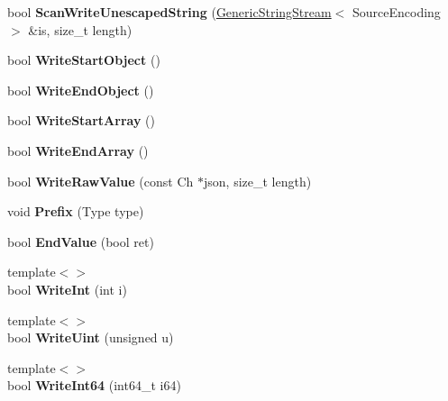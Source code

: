 \begin{DoxyCompactItemize}
\mbox{\label{classWriter_a1a886f73bd0b094043899a71b65c92d5}} 
bool {\bfseries Scan\+Write\+Unescaped\+String} (\hyperlink{structGenericStringStream}{Generic\+String\+Stream}$<$ Source\+Encoding $>$ \&is, size\+\_\+t length)
\item 
\mbox{\label{classWriter_ad3578f94664c62e6b0773f4dc0567a17}} 
bool {\bfseries Write\+Start\+Object} ()
\item 
\mbox{\label{classWriter_a9f76fcffaf403a49a311de074a23de2d}} 
bool {\bfseries Write\+End\+Object} ()
\item 
\mbox{\label{classWriter_af3804bde535cf36e0733c07a56742111}} 
bool {\bfseries Write\+Start\+Array} ()
\item 
\mbox{\label{classWriter_a9d7ec17cfb0b64a88c009871ba741f52}} 
bool {\bfseries Write\+End\+Array} ()
\item 
\mbox{\label{classWriter_ad502719b59b9d037bb3c3c3a1f462e6c}} 
bool {\bfseries Write\+Raw\+Value} (const Ch $\ast$json, size\+\_\+t length)
\item 
\mbox{\label{classWriter_ad56f2e953b7919ad2157a2fc2bedf873}} 
void {\bfseries Prefix} (Type type)
\item 
\mbox{\label{classWriter_a087faa974923e67f51edeb290ca00dd1}} 
bool {\bfseries End\+Value} (bool ret)
\item 
\mbox{\label{classWriter_abefb163a93b376d056edecad5a7a82ef}} 
{\footnotesize template$<$$>$ }\\bool {\bfseries Write\+Int} (int i)
\item 
\mbox{\label{classWriter_a9665a4a1549b286944b21927b80060cf}} 
{\footnotesize template$<$$>$ }\\bool {\bfseries Write\+Uint} (unsigned u)
\item 
\mbox{\label{classWriter_a3528a42394d50f3b92659de517433c85}} 
{\footnotesize template$<$$>$ }\\bool {\bfseries Write\+Int64} (int64\+\_\+t i64)

\end{DoxyCompactItemize}
